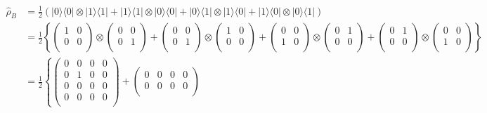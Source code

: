 \begin{equation}
\begin{split}
\hat{\rho }_{B }&=\frac{1}{2}(|0\rangle \langle 0|\otimes |1\rangle \langle 1|+|1\rangle \langle 1|\otimes |0\rangle \langle 0|+|0\rangle \langle 1|\otimes |1\rangle \langle 0|+|1\rangle \langle 0|\otimes |0\rangle \langle 1|)\\
&=\frac{1}{2}\left\{\begin{pmatrix} 
1&0\\
0&0\\
\end{pmatrix} 
\otimes \begin{pmatrix} 
0&0\\
0&1\\
\end{pmatrix} 
+\begin{pmatrix} 
0&0\\
0&1\\
\end{pmatrix} 
\otimes \begin{pmatrix} 
1&0\\
0&0\\
\end{pmatrix} 
+\begin{pmatrix} 
0&0\\
1&0\\
\end{pmatrix} 
\otimes \begin{pmatrix} 
0&1\\
0&0\\
\end{pmatrix} 
+\begin{pmatrix} 
0&1\\
0&0\\
\end{pmatrix} 
\otimes \begin{pmatrix} 
0&0\\
1&0\\
\end{pmatrix} 
\right\}\\
&=\frac{1}{2}\left\{\begin{pmatrix} 
0&0&0&0\\
0&1&0&0\\
0&0&0&0\\
0&0&0&0\\
\end{pmatrix} 
+\begin{pmatrix} 
0&0&0&0\\
0&0&0&0\\

\end{pmatrix}
\end{split}
\end{equation}
